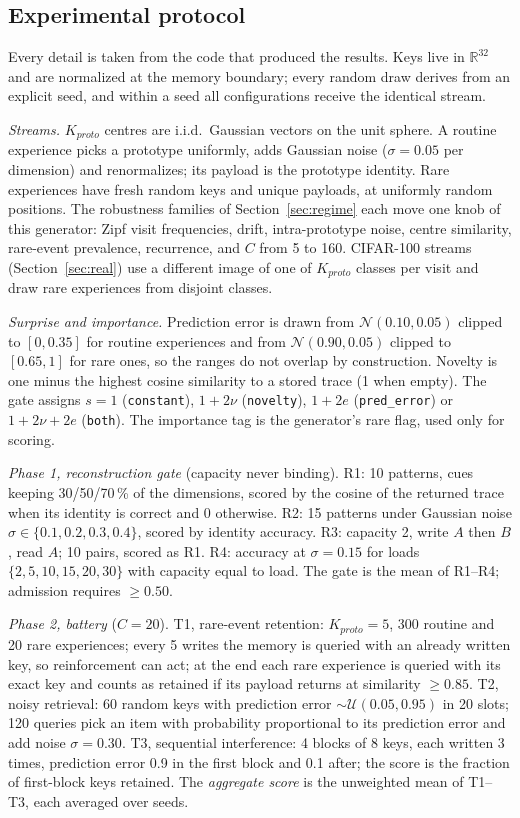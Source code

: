 \documentclass[conference]{IEEEtran}
\begin{document}
\subsection{Experimental protocol}
\label{sec:protocol}

Every detail is taken from the code that produced the results. Keys live in
$\mathbb{R}^{32}$ and are normalized at the memory boundary; every random draw
derives from an explicit seed, and within a seed all configurations receive the
identical stream.

\emph{Streams.} $K_{proto}$ centres are i.i.d.\ Gaussian vectors on the unit
sphere. A routine experience picks a prototype uniformly, adds Gaussian noise
($\sigma=0.05$ per dimension) and renormalizes; its payload is the prototype
identity. Rare experiences have fresh random keys and unique payloads, at
uniformly random positions. The robustness families of
Section~\ref{sec:regime} each move one knob of this generator: Zipf visit
frequencies, drift, intra-prototype noise, centre similarity, rare-event
prevalence, recurrence, and $C$ from 5 to 160. CIFAR-100 streams
(Section~\ref{sec:real}) use a different image of one of $K_{proto}$ classes
per visit and draw rare experiences from disjoint classes.

\emph{Surprise and importance.} Prediction error is drawn from
$\mathcal{N}(0.10,0.05)$ clipped to $[0,0.35]$ for routine experiences and
from $\mathcal{N}(0.90,0.05)$ clipped to $[0.65,1]$ for rare ones, so the
ranges do not overlap by construction. Novelty is one minus the highest cosine
similarity to a stored trace (1 when empty). The gate assigns $s=1$
(\texttt{constant}), $1+2\nu$ (\texttt{novelty}), $1+2e$ (\texttt{pred\_error})
or $1+2\nu+2e$ (\texttt{both}). The importance tag is the generator's rare
flag, used only for scoring.

\emph{Phase 1, reconstruction gate} (capacity never binding). R1: 10 patterns,
cues keeping 30/50/70\,\% of the dimensions, scored by the cosine of the
returned trace when its identity is correct and 0 otherwise. R2: 15 patterns
under Gaussian noise $\sigma\in\{0.1,0.2,0.3,0.4\}$, scored by identity
accuracy. R3: capacity 2, write $A$ then $B$, read $A$; 10 pairs, scored as R1.
R4: accuracy at $\sigma=0.15$ for loads $\{2,5,10,15,20,30\}$ with capacity
equal to load. The gate is the mean of R1--R4; admission requires $\geq 0.50$.

\emph{Phase 2, battery} ($C=20$). T1, rare-event retention: $K_{proto}=5$, 300
routine and 20 rare experiences; every 5 writes the memory is queried with an
already written key, so reinforcement can act; at the end each rare experience
is queried with its exact key and counts as retained if its payload returns at
similarity $\geq 0.85$. T2, noisy retrieval: 60 random keys with prediction
error $\sim\mathcal{U}(0.05,0.95)$ in 20 slots; 120 queries pick an item with
probability proportional to its prediction error and add noise $\sigma=0.30$.
T3, sequential interference: 4 blocks of 8 keys, each written 3 times,
prediction error 0.9 in the first block and 0.1 after; the score is the
fraction of first-block keys retained. The \emph{aggregate score} is the
unweighted mean of T1--T3, each averaged over seeds.
\end{document}
